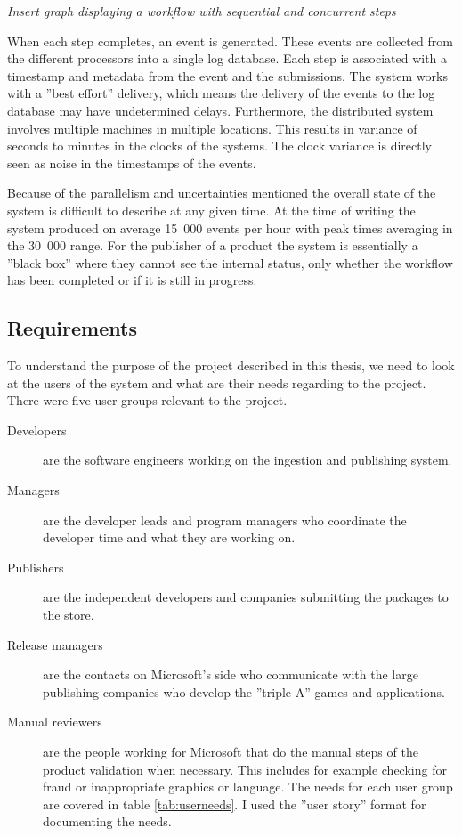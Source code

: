 \documentclass[english,12pt,a4paper,pdftex,sci,utf8]{aaltothesis}
\theoremstyle{definition}
\newcommand{\nyi}[1]{\noindent\colorbox{nyibg}{\textcolor{nyitext}{\emph{#1}}}}
\begin{document}
\nyi{Insert graph displaying a workflow with sequential and concurrent steps}

When each step completes, an event is generated.
These events are collected from the different processors into a single log database.
Each step is associated with a timestamp and metadata from the event and the submissions.
The system works with a ''best effort'' delivery, which means the delivery of the events to the log database
may have undetermined delays. Furthermore, the distributed system involves multiple machines
in multiple locations. This results in variance of seconds to minutes in the clocks of the systems.
The clock variance is directly seen as noise in the timestamps of the events.

Because of the parallelism and uncertainties mentioned the overall state of the system is difficult to describe at any given time. At the time of writing the system produced on average 15~000 events per hour with peak times averaging in the 30~000 range. For the publisher of a product the system is essentially a ''black box'' where
they cannot see the internal status, only whether the workflow has been completed or if it is still in progress.

\subsection{Requirements}

To understand the purpose of the project described in this thesis, we need to look at the users of the system
and what are their needs regarding to the project. There were five user groups relevant to the project.

\begin{description}
\item[Developers] are the software engineers working on the ingestion and publishing system.
\item[Managers] are the developer leads and program managers who coordinate the developer time and what they are working on.
\item[Publishers] are the independent developers and companies submitting the packages to the store.
\item[Release managers] are the contacts on Microsoft's side who communicate with the large publishing companies who develop the ''triple-A'' games and applications.
\item[Manual reviewers] are the people working for Microsoft that do the manual steps of the product validation when necessary. This includes for example checking for fraud or inappropriate graphics or language.
The needs for each user group are covered in table \ref{tab:userneeds}.
I used the ''user story'' format for documenting the needs.
\end{description}
\end{document}
